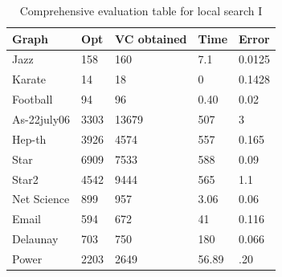 \begin{table}[htb]
\caption{Comprehensive evaluation table for local search I}
\label{tab2_1}
\begin{minipage}{\columnwidth}
\begin{center}
\begin{tabular}{@{}lllll@{}}
\toprule
Graph       & Opt  & VC obtained & Time  & Error  \\ \midrule
Jazz        & 158  & 160         & 7.1   & 0.0125 \\
Karate      & 14   & 18          & 0     & 0.1428 \\
Football    & 94   & 96          & 0.40  & 0.02   \\
As-22july06 & 3303 & 13679       & 507   & 3      \\
Hep-th      & 3926 & 4574        & 557   & 0.165  \\
Star        & 6909 & 7533        & 588   & 0.09   \\
Star2       & 4542 & 9444        & 565   & 1.1    \\
Net Science & 899  & 957         & 3.06  & 0.06   \\
Email       & 594  & 672         & 41    & 0.116  \\
Delaunay    & 703  & 750         & 180   & 0.066  \\
Power       & 2203 & 2649        & 56.89 & .20    \\ \bottomrule
\end{tabular}
\end{center}
\end{minipage}
\end{table}

